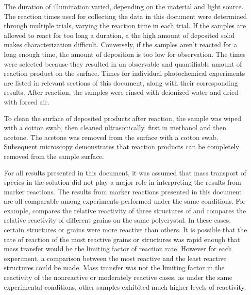 The duration of illumination varied, depending on the material and light source. The reaction times used for collecting the data in this document were determined through multiple trials, varying the reaction time in each trial. If the samples are allowed to react for too long a duration, a the high amount of deposited solid makes characterization difficult. Conversely, if the samples aren't reacted for a long enough time, the amount of deposition is too low for observation. The times were selected because they resulted in an observable and quantifiable amount of reaction product on the surface. Times for individual photochemical experiments are listed in relevant sections of this document, along with their corresponding results. After reaction, the samples were rinsed with deionized water and dried with forced air.

To clean the surface of deposited products after reaction, the sample was wiped with a cotton swab, then cleaned ultrasonically, first in methanol and then acetone. The acetone was removed from the surface with a cotton swab. Subsequent microscopy demonstrates that reaction products can be completely removed from the sample surface.

\label{masstransfer}
For all results presented in this document, it was assumed that mass transport of species in the solution did not play a major role in interpreting the results from marker reactions. The results from marker reactions presented in this document are all comparable among experiments performed under the same conditions. For example,  compares the relative reactivity of three structures of  and  compares the relative reactivity of different  grains on the same polycrystal. In these cases, certain structures or grains were more reactive than others. It is possible that the rate of reaction of the most reactive grains or structures was rapid enough that mass transfer would be the limiting factor of reaction rate. However for each experiment, a comparison between the most reactive and the least reactive structures could be made. Mass transfer was not the limiting factor in the reactivity of the nonreactive or moderately reactive cases, as under the same experimental conditions, other samples exhibited much higher levels of reactivity.

